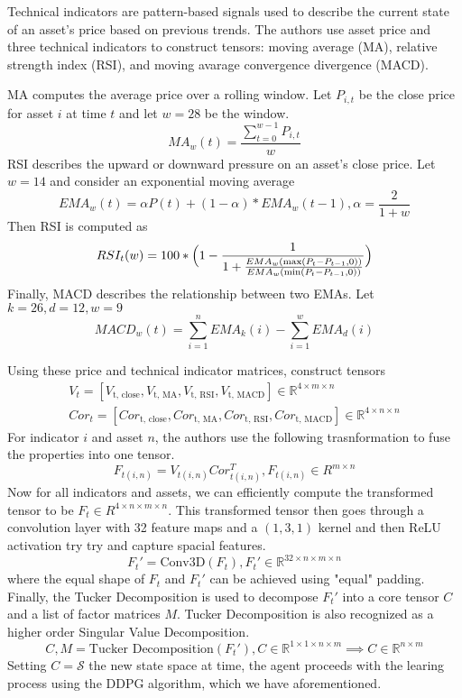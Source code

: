 Technical indicators are pattern-based signals used to describe the current state 
of an asset's price based on previous trends. The authors use asset price and three technical indicators to construct 
tensors: moving average (MA), relative strength index (RSI), and moving avarage convergence divergence (MACD).

MA computes the average price over a rolling window. Let $P_{i,t}$ be the close 
price for asset $i$ at time $t$ and let $w = 28$ be the window. 
\[MA_w(t) = \frac{\sum_{t=0}^{w-1}P_{i, t}}{w}\] 
RSI describes the upward or downward pressure on an asset's close price.
Let $w=14$ and consider an exponential moving average 
\[EMA_w(t) = \alpha P(t) + (1-\alpha) * EMA_w(t-1), \alpha = \frac{2}{1 + w}\]
Then RSI is computed as 
\[RSI_t(w) = 100 * \Bigl(1 - \frac{1}{1 + \frac{EMA_w(\max(P_t - P_{t-1}, 0))}{EMA_w(\min(P_t - P_{t-1}, 0))}}\Bigr)\]
Finally, MACD describes the relationship between two EMAs. Let $k = 26, d=12, w=9$
\[MACD_w(t) = \sum_{i=1}^n EMA_k(i) - \sum_{i=1}^w EMA_d(i)\]

Using these price and technical indicator matrices, construct tensors 
\begin{align*}
  V_t = [V_{\text{t, close}}, V_{\text{t, MA}}, V_{\text{t, RSI}}, V_{\text{t, MACD}}] \in \mathbb{R}^{4 \times m \times n}\\
  Cor_t = [Cor_{\text{t, close}}, Cor_{\text{t, MA}}, Cor_{\text{t, RSI}}, Cor_{\text{t, MACD}}] \in \mathbb{R}^{4 \times n \times n}
\end{align*}
For indicator $i$ and asset $n$, the authors use the following trasnformation to fuse the properties 
into one tensor. 
\[F_{t(i, n)} = V_{t(i, n)} Cor^T_{t(i, n)}, F_{t(i, n)} \in R^{m \times n}\]
Now for all indicators and assets, we can efficiently compute the transformed tensor to be $F_t \in R^{4 \times n \times m \times n}$.
This transformed tensor then goes through a convolution layer with 32 feature maps and a $(1, 3, 1)$ kernel and then ReLU activation try 
try and capture spacial features.
\[F_t' = \text{Conv3D}(F_t), F_t' \in \mathbb{R}^{32 \times n \times m \times n}\]
where the equal shape of $F_t$ and $F_t'$ can be achieved using "equal" padding. Finally, the Tucker Decomposition is used
to decompose $F_t'$ into a core tensor $C$ and a list of factor matrices $M$. Tucker Decomposition is also recognized as a higher order Singular Value Decomposition. 
\[C, M = \text{Tucker Decomposition}(F_t'), C \in \mathbb{R}^{1 \times 1 \times n \times m} \implies C \in \mathbb{R}^{n \times m}\]
Setting $C = \mathcal{S}$ the new state space at time, the agent proceeds with the learing process
using the DDPG algorithm, which we have aforementioned.

